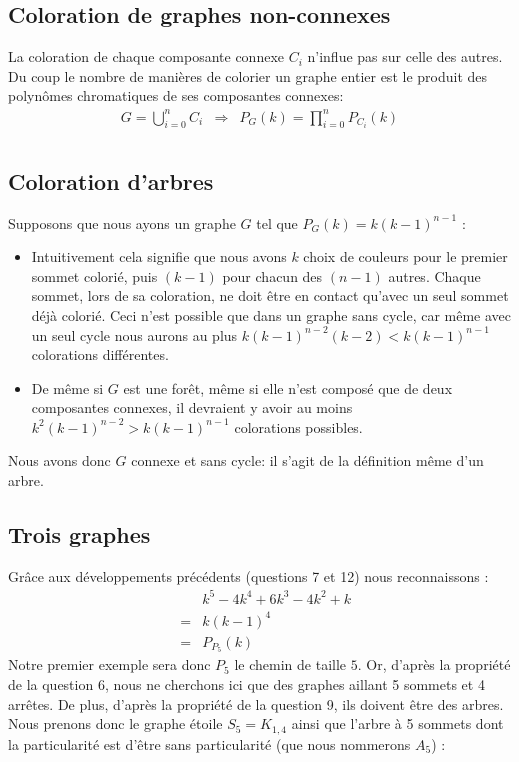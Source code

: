 \subsection{Coloration de graphes non-connexes}
La coloration de chaque composante connexe $C_i$ n’influe pas sur celle des autres. Du coup le nombre de manières de colorier un graphe entier est le produit des polynômes chromatiques de ses composantes connexes:
\begin{eqnarray*}
G = \bigcup_{i=0}^n C_i & \Rightarrow & P_G(k)=\prod_{i=0}^n P_{C_i}(k) \\
\end{eqnarray*}

\subsection{Coloration d'arbres}
Supposons que nous ayons un graphe $G$ tel que $P_G(k) = k(k-1)^{n-1}$ :
\begin {itemize}
\item Intuitivement cela signifie que nous avons $k$ choix de couleurs pour le premier sommet colorié, puis $(k-1)$ pour chacun des $(n-1)$ autres. Chaque sommet, lors de sa coloration, ne doit être en contact qu'avec un seul sommet déjà colorié. Ceci n'est possible que dans un graphe sans cycle, car même avec un seul cycle nous aurons au plus $k(k-1)^{n-2}(k-2) < k(k-1)^{n-1}$ colorations différentes.
\item De même si $G$ est une forêt, même si elle n'est composé que de deux composantes connexes, il devraient y avoir au moins $k^2(k-1)^{n-2} > k(k-1)^{n-1}$ colorations possibles.
\end {itemize}
Nous avons donc $G$ connexe et sans cycle: il s'agit de la définition même d'un arbre.

\subsection{Trois graphes}
Grâce aux développements précédents (questions 7 et 12) nous reconnaissons :
\begin{eqnarray*}
&&		k^5 - 4k^4 + 6k^3 - 4k^2 + k 	\\	
&=&		k(k-1)^4						\\
&=&		P_{P_5}(k)						
\end{eqnarray*}
Notre premier exemple sera donc $P_5$ le chemin de taille $5$. Or, d'après la propriété de la question 6, nous ne cherchons ici que des graphes aillant 5 sommets et 4 arrêtes. De plus, d'après la propriété de la question 9, ils doivent être des arbres. Nous prenons donc le graphe étoile $S_5 = K_{1,4}$ ainsi que l'arbre à 5 sommets dont la particularité est d'être sans particularité (que nous nommerons $A_5$) :

